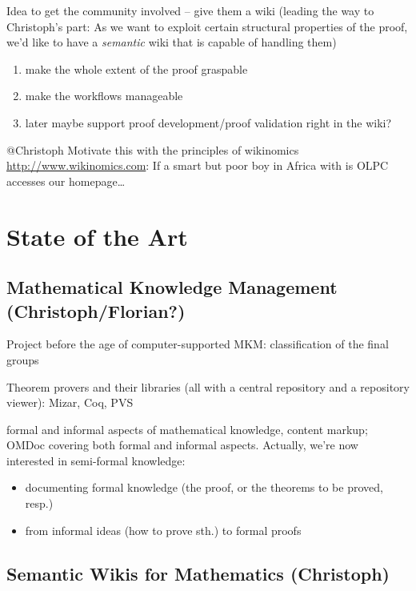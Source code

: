 \documentclass{llncs}
\begin{document}
Idea to get the community involved -- give them a wiki (leading the way to Christoph's
part: As we want to exploit certain structural properties of the proof, we'd like to have
a \emph{semantic} wiki that is capable of handling them)

\begin{enumerate}
\item make the whole extent of the proof graspable
\item make the workflows manageable
\item later maybe support proof development/proof validation right in the
  wiki?
\end{enumerate}

\begin{todo}{@Christoph}
  Motivate this with the principles of wikinomics \url{http://www.wikinomics.com}: If a
  smart but poor boy in Africa with is OLPC accesses our homepage\ldots
\end{todo}

\section{State of the Art}
\label{sec:sota}

\subsection{Mathematical Knowledge Management (Christoph/Florian?)}
\label{sec:mkm}

Project before the age of computer-supported MKM: classification of the final groups

Theorem provers and their libraries (all with a central repository and a repository
viewer): Mizar, Coq, PVS

formal and informal aspects of mathematical knowledge, content markup; OMDoc covering both
formal and informal aspects.  Actually, we're now interested in semi-formal
knowledge:
\begin{itemize}
\item documenting formal knowledge (the proof, or the theorems to be proved, resp.)
\item from informal ideas (how to prove sth.) to formal proofs
\end{itemize}

\subsection{Semantic Wikis for Mathematics (Christoph)}
\label{sec:semwiki}
\end{document}

